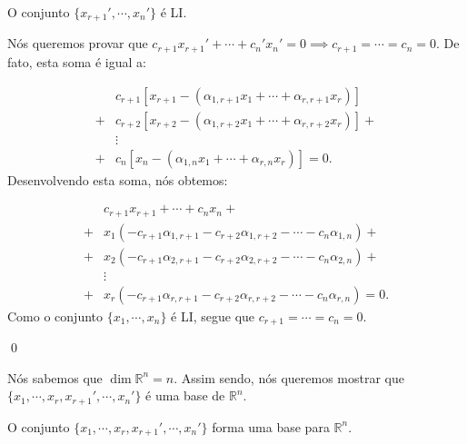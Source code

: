 \begin{Lemma}
	O conjunto $\{x_{r + 1}', \cdots, x_n'\}$ é LI.
\end{Lemma}

\begin{Proof}
	Nós queremos provar que $c_{r + 1}x_{r + 1}' + \cdots + c_{n}'x_n' = 0\implies c_{r + 1} = \cdots = c_n = 0$. De fato, esta soma é igual a:
	
	\begin{align*}
		&c_{r + 1}[x_{r + 1} - (\alpha_{1, r + 1}x_1 + \cdots + \alpha_{r, r + 1}x_r)] \\
		+ &c_{r + 2}[x_{r + 2} - (\alpha_{1, r + 2}x_1 + \cdots + \alpha_{r, r + 2}x_r)] + \\
		&\vdots \\
		+ &c_n[x_n - (\alpha_{1, n}x_1 + \cdots + \alpha_{r, n}x_r)] = 0.
	\end{align*}
	Desenvolvendo esta soma, nós obtemos:
	
	\begin{align*}
		&c_{r + 1}x_{r + 1} + \cdots + c_nx_n + \\
		+ &x_1(- c_{r + 1}\alpha_{1, r + 1} - c_{r + 2}\alpha_{1, r + 2} - \cdots - c_n\alpha_{1, n}) + \\
		+ &x_2(- c_{r + 1}\alpha_{2, r + 1} - c_{r + 2}\alpha_{2, r + 2} - \cdots - c_n\alpha_{2, n}) + \\
		&\vdots \\
		+ &x_r(- c_{r + 1}\alpha_{r, r + 1} - c_{r + 2}\alpha_{r, r + 2} - \cdots - c_n\alpha_{r, n}) = 0.
	\end{align*}
	Como o conjunto $\{x_1, \cdots, x_n\}$ é LI, segue que $c_{r + 1} = \cdots = c_n = 0$.
	
	\qed
\end{Proof}

Nós sabemos que $\dim\mathbb{R}^n = n$. Assim sendo, nós queremos mostrar que $\{x_1, \cdots, x_r, x_{r + 1}', \cdots, x_n'\}$ é uma base de $\mathbb{R}^n$.

\begin{Lemma}
	O conjunto $\{x_1, \cdots, x_r, x_{r + 1}', \cdots, x_n'\}$ forma uma base para $\mathbb{R}^n$.
\end{Lemma}

